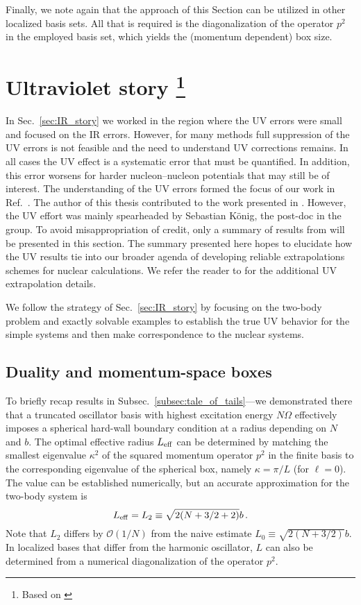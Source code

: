 	Finally, we note again that the approach of this Section can be
	utilized in other localized basis sets.  All that is required is the
	diagonalization of the operator $p^2$ in the employed basis set, which
	yields the (momentum dependent) box size.


	\section[Ultraviolet story]
	{Ultraviolet story \footnote{Based on \cite{Konig:2014hma}}}
	\label{sec:UV_story}

  In Sec.~\ref{sec:IR_story} we worked in the region where the UV errors were
	small and focused on the IR errors.  However, for many methods full
	suppression of the UV errors is not feasible and the need to understand
	UV corrections remains.  In all cases the UV effect is a systematic error
	that must be quantified.  In addition, this error worsens for harder
	nucleon--nucleon potentials	that may still be of interest.
	The understanding of the UV errors formed the focus of our work in
	Ref.~\cite{Konig:2014hma}.  The author of this thesis contributed to the work
	presented in \cite{Konig:2014hma}.  However, the UV effort was mainly
	spearheaded by Sebastian K\"{o}nig, the post-doc in the group.  To avoid
	misappropriation of credit, only a summary of results from
	\cite{Konig:2014hma} will be presented in this section.
	The summary presented here hopes to elucidate how the UV results tie into
	our broader agenda of developing reliable extrapolations schemes for nuclear
	calculations.  We refer the reader to \cite{Konig:2014hma} for the additional
	UV extrapolation details.

	We follow the strategy of Sec.~\ref{sec:IR_story} by focusing on the
	two-body problem and exactly solvable examples to establish the true
	UV behavior for the	simple systems and then make correspondence to the
	nuclear systems.

	\subsection{Duality and momentum-space boxes}
	\label{subsec:UV_cutoff_duality}

	To briefly recap results in Subsec.~\ref{subsec:tale_of_tails}---we
	demonstrated there that a
	truncated oscillator basis with highest excitation energy
	$N\Omega$ effectively imposes a spherical hard-wall boundary condition
	at a radius depending on $N$ and $b$.  The optimal effective radius
	$L_{\rm eff}$ can be determined by matching the smallest eigenvalue
	$\kappa^2$ of the squared momentum operator $p^2$ in the finite
	basis to the corresponding eigenvalue of the spherical box, namely
	$\kappa=\pi/L$ (for $\ell=0$).  The value can be established numerically,
	but an accurate approximation for the two-body system is
	\begin{equation}
	\label{eq:L2_def}
	  L_{\rm eff} = L_2\equiv\sqrt{2(N+3/2+2)}b \,.
	\end{equation}
	Note that $L_2$ differs by $\mathcal{O}(1/N)$ from the naive estimate
	$L_0\equiv\sqrt{2(N+3/2)}b$.  In localized bases that differ from the
	harmonic oscillator, $L$ can also be determined from a numerical
	diagonalization of the operator $p^2$.

